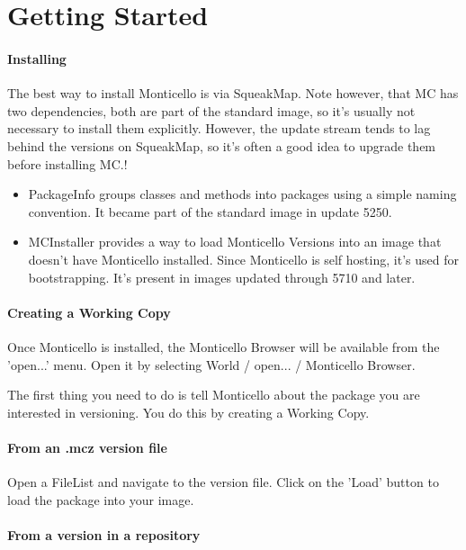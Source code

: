 \documentclass[a4paper,10pt,twoside]{book}
\begin{document}
\section{Getting Started}

\paragraph{Installing}

The best way to install Monticello is via SqueakMap. Note however, that MC has two dependencies, both are part of the standard image, so it's usually not necessary to install them explicitly. However, the update stream tends to lag behind the versions on SqueakMap, so it's often a good idea to upgrade them before installing MC.!
\begin{itemize}
\item PackageInfo groups classes and methods into packages using a simple naming convention. It became part of the standard image in update 5250.
\item MCInstaller provides a way to load Monticello Versions into an image that doesn't have Monticello installed. Since Monticello is self hosting, it's used for bootstrapping. It's present in images updated through 5710 and later.
\end{itemize}

\paragraph{Creating a Working Copy}

Once Monticello is installed, the Monticello Browser will be available from the 'open...' menu. Open it by selecting World / open... / Monticello Browser.

The first thing you need to do is tell Monticello about the package you are interested in versioning. You do this by creating a Working Copy.

\paragraph{From an .mcz version file}
Open a FileList and navigate to the version file. Click on the 'Load' button to load the package into your image.

\paragraph{From a version in a repository}
\end{document}
